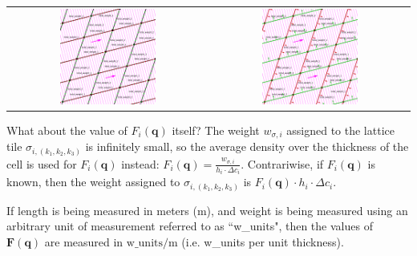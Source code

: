 \documentclass{book}
\begin{document}
\begin{center}
\begin{tabular}{cc}
\parbox{0.5\textwidth}{
\includegraphics[width = 0.5\textwidth]{Coordinate_systems/surface_density_2D_stage_1}
} & \parbox{0.5\textwidth}{
\includegraphics[width = 0.5\textwidth]{Coordinate_systems/surface_density_2D_stage_2}
}
\end{tabular}
\end{center}

What about the value of \(F_i(\mathbf{q})\) itself? The weight \(w_{\sigma,i}\) assigned to the lattice tile \(\sigma_{i, (k_1,k_2,k_3)}\) is infinitely small, so the average density over the thickness of the cell is used for \(F_i(\mathbf{q})\) instead: \(F_i(\mathbf{q}) = \frac{w_{\sigma,i}}{h_i \cdot \Delta c_i}\). Contrariwise, if \(F_i(\mathbf{q})\) is known, then the weight assigned to \(\sigma_{i, (k_1,k_2,k_3)}\) is \(F_i(\mathbf{q}) \cdot h_i \cdot \Delta c_i\).

If length is being measured in meters (m), and weight is being measured using an arbitrary unit of measurement referred to as ``w\_units", then the values of \(\mathbf{F}(\mathbf{q})\) are measured in \(\text{w\_units}/\text{m}\) (i.e. w\_units per unit thickness).
\end{document}
